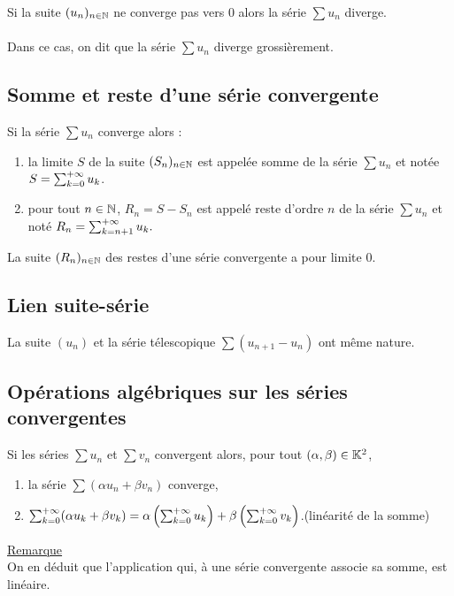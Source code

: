 \begin{defprop}
    Si la suite \((u_n)_{n\in \mathbb{N} }\) ne converge pas vers \(0\) alors la série \(\sum u_n \) diverge.\\~\\
    Dans ce cas,
    on dit que la série \(\sum u_n \) diverge grossièrement.
\end{defprop}

\subsection{Somme et reste d’une série convergente}
\begin{defi}
    Si la série \(\sum u_n \) converge alors :
    \begin{enumerate}
        \item la limite \(S\) de la suite \((S_n)_{n \in \mathbb{N}}\) est appelée somme de la série \(\sum u_n \) et notée \(S =\sum^{+\infty}_{k=0}u_k\).
        \item pour tout \(n \in  \mathbb{N}\), \(R_n = S - S_n\) est appelé reste d’ordre \(n\) de la série \(\sum u_n \) et noté \(R_n = \sum^{+\infty}_{k=n+1}u_k.\)
    \end{enumerate}
\end{defi}
\begin{prop}
    La suite \((R_n)_{n\in \mathbb{N}}\) des restes d’une série convergente a pour limite \(0\).
\end{prop}
\subsection{Lien suite-série}
\begin{defprop}
    La suite \((u_n)\) et la série télescopique \(\sum (u_{n+1} - u_n)\) ont même nature.
\end{defprop}
\subsection{Opérations algébriques sur les séries convergentes}
\begin{defprop}
    Si les séries \(\sum u_n \) et \(\sum v_n\) convergent alors, pour tout \((\alpha , \beta ) \in  \mathbb{K}^2\),
    \begin{enumerate}
        \item la série \(\sum(\alpha u_n + \beta v_n)\) converge,
        \item \(\sum^{+\infty}_{k=0}(\alpha u_k + \beta v_k) = \alpha \left(\sum^{+\infty}_{k=0}u_k\right)+ \beta \left(\sum^{+\infty}_{k=0}v_k\right)\).\hfill (linéarité de la somme)
    \end{enumerate}
    \underline{Remarque}\\
    On en déduit que l’application qui, à une série convergente associe sa somme, est linéaire.
\end{defprop}
